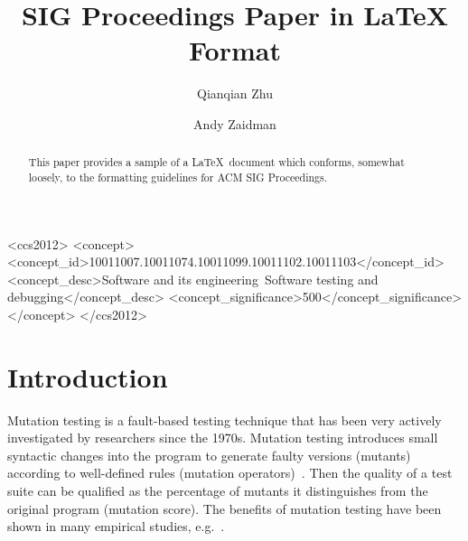 \documentclass[sigconf]{acmart}
\begin{document}
\title{SIG Proceedings Paper in LaTeX Format}

\author{Qianqian Zhu}

\author{Andy Zaidman}


\begin{abstract}
This paper provides a sample of a \LaTeX\ document which conforms,
somewhat loosely, to the formatting guidelines for
ACM SIG Proceedings.
\end{abstract}

%
%
\begin{CCSXML}
<ccs2012>
<concept>
<concept_id>10011007.10011074.10011099.10011102.10011103</concept_id>
<concept_desc>Software and its engineering~Software testing and debugging</concept_desc>
<concept_significance>500</concept_significance>
</concept>
</ccs2012>
\end{CCSXML}




\maketitle

\section{Introduction}

Mutation testing is a fault-based testing technique that has been very actively investigated by researchers since the 1970s. Mutation testing introduces small syntactic changes into the program to generate faulty versions (mutants) according to well-defined rules (mutation operators)~\cite{offutt2011mutation}. Then the quality of a test suite can be qualified as the percentage of mutants it distinguishes from the original program (mutation score). The benefits of mutation testing have been shown in many empirical studies, e.g.~\cite{mathur1994empirical, andrews2005mutation}. %
\end{document}
